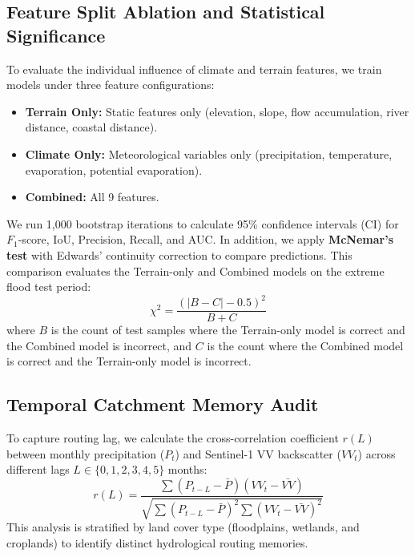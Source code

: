 \subsection{Feature Split Ablation and Statistical Significance}
To evaluate the individual influence of climate and terrain features, we train models under three feature configurations:
\begin{itemize}
    \item \textbf{Terrain Only:} Static features only (elevation, slope, flow accumulation, river distance, coastal distance).
    \item \textbf{Climate Only:} Meteorological variables only (precipitation, temperature, evaporation, potential evaporation).
    \item \textbf{Combined:} All 9 features.
\end{itemize}

We run 1,000 bootstrap iterations to calculate 95\% confidence intervals (CI) for $F_1$-score, IoU, Precision, Recall, and AUC. In addition, we apply \textbf{McNemar's test} with Edwards' continuity correction to compare predictions. This comparison evaluates the Terrain-only and Combined models on the extreme flood test period:
\begin{equation}
    \chi^2 = \frac{(|B - C| - 0.5)^2}{B + C}
\end{equation}
where $B$ is the count of test samples where the Terrain-only model is correct and the Combined model is incorrect, and $C$ is the count where the Combined model is correct and the Terrain-only model is incorrect.

\subsection{Temporal Catchment Memory Audit}
To capture routing lag, we calculate the cross-correlation coefficient $r(L)$ between monthly precipitation ($P_t$) and Sentinel-1 VV backscatter ($VV_t$) across different lags $L \in \{0, 1, 2, 3, 4, 5\}$ months:
\begin{equation}
    r(L) = \frac{\sum (P_{t-L} - \bar{P})(VV_t - \bar{VV})}{\sqrt{\sum (P_{t-L} - \bar{P})^2 \sum (VV_t - \bar{VV})^2}}
\end{equation}
This analysis is stratified by land cover type (floodplains, wetlands, and croplands) to identify distinct hydrological routing memories.
